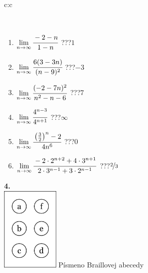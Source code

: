 \documentclass[10pt]{report}
\begin{document}
\begin{tabular}{c:c}
\begin{minipage}[c][104.5mm][t]{0.5\linewidth}
\begin{center}
\begin{minipage}{0.95\linewidth}
\begin{center}
\end{center}
\end{minipage}
\\[1mm]
\begin{minipage}{0.79\linewidth}
\begin{center}
\begin{varwidth}{\linewidth}
\begin{enumerate}
\normalsize
\item $\lim\limits_{n\to\infty}\cfrac{-2-n}{1-n}$\quad \dotfill\; ???\;\dotfill \quad $1$
\item $\lim\limits_{n\to\infty}\cfrac{6(3-3n)}{(n-9)^2}$\quad \dotfill\; ???\;\dotfill \quad $-3$
\item $\lim\limits_{n\to\infty}\cfrac{(-2-7n)^2}{n^2-n-6}$\quad \dotfill\; ???\;\dotfill \quad $7$
\item $\lim\limits_{n\to\infty}\cfrac{4^{n-3}}{4^{n+1}}$\quad \dotfill\; ???\;\dotfill \quad $\infty$
\item $\lim\limits_{n\to\infty}\cfrac{\left(\frac{3}{2}\right)^n -2}{4n^{6}}$\quad \dotfill\; ???\;\dotfill \quad $0$
\item $\lim\limits_{n\to\infty}\cfrac{-2\cdot 2^{n+2}+4\cdot 3^{n+1}}{2\cdot 3^{n-1}+3\cdot 2^{n-1}}$\quad \dotfill\; ???\;\dotfill \quad $\nicefrac{2}{3}$
\end{enumerate}
\end{varwidth}
\end{center}
\end{minipage}
\begin{minipage}{0.20\linewidth}
\begin{center}
{\Huge\bfseries 4.} \\[2mm]
\includegraphics[height=40mm]{../images/braille.png}
{\small Písmeno Braillovej abecedy}
\end{center}
\end{minipage}
\end{center}
\end{minipage}
%
\end{tabular}
\newpage
\thispagestyle{empty}
\end{document}
